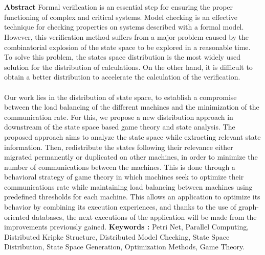 \chapter*{}
\begin{changemargin}{3mm}{0cm}
	\begin{minipage}[c]{0.96\columnwidth} 
		{\LARGE\textbf{Abstract}}
		\vskip1mm
		\begingroup
		Formal verification is an essential step for ensuring the proper functioning of complex and critical systems. Model checking is an effective technique for checking properties on systems described with a formal model. However, this verification method suffers from a major problem caused by the combinatorial explosion of the state space to be explored in a reasonable time.
		\\
		
		To solve this problem, the states space distribution is the most widely used solution for the distribution of calculations. On the other hand, it is difficult to obtain a better distribution to accelerate the calculation of the verification.
		\\\\
		Our work lies in the distribution of state space, to establish a compromise between the load balancing of the different machines and the minimization of the communication rate. For this, we propose a new distribution approach in downstream of the state space based game theory and state analysis. The proposed approach aims to analyze the state space while extracting relevant state information. Then, redistribute the states following their relevance either migrated permanently or duplicated on other machines, in order to minimize the number of communications between the machines. This is done through a behavioral strategy of game theory in which machines seek to optimize their communications rate while maintaining load balancing between machines using predefined thresholds for each machine. This allows an application to optimize its behavior by combining its execution experiences, and thanks to the use of graph-oriented databases, the next executions of the application will be made from the improvements previously gained.
		\endgroup
		\vskip1mm
		{\textbf{Keywords : }
			\begingroup			
			Petri Net, Parallel Computing, Distributed Kripke Structure, Distributed Model Checking, State Space Distribution,	State Space Generation, Optimization Methods, Game Theory.
			\endgroup
		}
    \end{minipage}    
\end{changemargin}